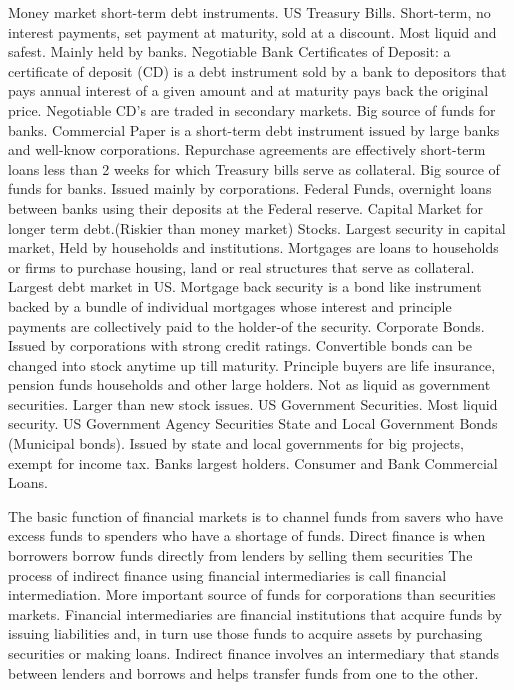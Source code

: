 \documentclass[12pt]{examnotes}
\begin{document}

\ra Money market short-term debt instruments.
 US Treasury Bills. Short-term, no interest payments, set payment at maturity, sold at a discount. Most liquid and safest. Mainly held by banks.
 Negotiable Bank Certificates of Deposit: a certificate of deposit (CD) is a debt instrument sold by a bank to depositors that pays annual interest of a given amount and at maturity pays back the original price. Negotiable CD’s are traded in secondary markets.  Big source of funds for banks.
 Commercial Paper is a short-term debt instrument issued by large banks and well-know corporations.
 Repurchase agreements are effectively short-term loans less than 2 weeks for which Treasury bills serve as collateral. Big source of funds for banks. Issued mainly by corporations.
 Federal Funds, overnight loans between banks using their deposits at the Federal reserve.
\vspace{6pt}
\ra Capital Market for longer term debt.(Riskier than money market) 
 Stocks. Largest security in capital market, Held by households and institutions.
 Mortgages are loans to households or firms to purchase housing, land or real structures that serve as collateral. Largest debt market in US. 
\rna  Mortgage back security is a bond like instrument backed by a bundle of individual mortgages whose interest and principle payments are collectively paid to the holder-of the security.
 Corporate Bonds. Issued by corporations with strong credit ratings. Convertible bonds can be changed into stock anytime up till maturity. Principle buyers are life insurance, pension funds households and other large holders. Not as liquid as government securities. Larger than new stock issues.
 US Government Securities. Most liquid security.
 US Government Agency Securities
 State and Local Government Bonds (Municipal bonds). Issued by state and local governments for big projects, exempt for income tax. Banks largest holders.
 Consumer and Bank Commercial Loans.

\ra The basic function of financial markets is to channel funds from savers who have excess funds to spenders who have a shortage of funds. 
\ra Direct finance is when borrowers borrow funds directly from lenders by selling them securities
\ra The process of indirect finance using financial intermediaries is call financial intermediation.
\ra More important source of funds for corporations than securities markets.
\ra Financial intermediaries are financial institutions that acquire funds by issuing liabilities and, in turn use those funds to acquire assets by purchasing securities or making loans.
\ra Indirect finance involves an intermediary that stands between lenders and borrows and helps transfer funds from one to the other. 
\end{document}
